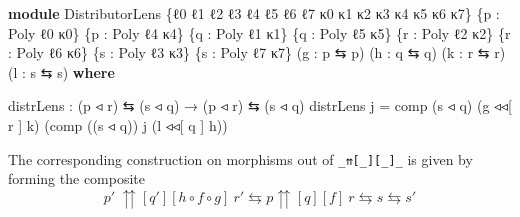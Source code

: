 \documentclass[
  11pt,
  oneside,
  article]{memoir}
\newenvironment{Shaded}{}{}
\newcommand{\KeywordTok}[1]{\textcolor[rgb]{0.00,0.44,0.13}{\textbf{#1}}}
\newcommand{\NormalTok}[1]{#1}
\newcommand{\OtherTok}[1]{\textcolor[rgb]{0.00,0.44,0.13}{#1}}
\theoremstyle{definition}
\theoremstyle{plain}
\newcommand{\0}{\textsf{0}}
\newcommand{\1}{\tn{\textsf{1}}}
\begin{document}
\begin{Shaded}
\begin{Highlighting}[]
\KeywordTok{module}\NormalTok{ DistributorLens }\OtherTok{\{}\NormalTok{ℓ0 ℓ1 ℓ2 ℓ3 ℓ4 ℓ5 ℓ6 ℓ7}
\NormalTok{                        κ0 κ1 κ2 κ3 κ4 κ5 κ6 κ7}\OtherTok{\}}
                       \OtherTok{\{}\NormalTok{p }\OtherTok{:}\NormalTok{ Poly ℓ0 κ0}\OtherTok{\}} \OtherTok{\{}\NormalTok{p\textquotesingle{} }\OtherTok{:}\NormalTok{ Poly ℓ4 κ4}\OtherTok{\}}
                       \OtherTok{\{}\NormalTok{q }\OtherTok{:}\NormalTok{ Poly ℓ1 κ1}\OtherTok{\}} \OtherTok{\{}\NormalTok{q\textquotesingle{} }\OtherTok{:}\NormalTok{ Poly ℓ5 κ5}\OtherTok{\}}
                       \OtherTok{\{}\NormalTok{r }\OtherTok{:}\NormalTok{ Poly ℓ2 κ2}\OtherTok{\}} \OtherTok{\{}\NormalTok{r\textquotesingle{} }\OtherTok{:}\NormalTok{ Poly ℓ6 κ6}\OtherTok{\}}
                       \OtherTok{\{}\NormalTok{s }\OtherTok{:}\NormalTok{ Poly ℓ3 κ3}\OtherTok{\}} \OtherTok{\{}\NormalTok{s\textquotesingle{} }\OtherTok{:}\NormalTok{ Poly ℓ7 κ7}\OtherTok{\}}
                       \OtherTok{(}\NormalTok{g }\OtherTok{:}\NormalTok{ p\textquotesingle{} ⇆ p}\OtherTok{)} \OtherTok{(}\NormalTok{h }\OtherTok{:}\NormalTok{ q ⇆ q\textquotesingle{}}\OtherTok{)} 
                       \OtherTok{(}\NormalTok{k }\OtherTok{:}\NormalTok{ r\textquotesingle{} ⇆ r}\OtherTok{)} \OtherTok{(}\NormalTok{l }\OtherTok{:}\NormalTok{ s ⇆ s\textquotesingle{}}\OtherTok{)} \KeywordTok{where}

\NormalTok{    distrLens }\OtherTok{:} \OtherTok{(}\NormalTok{p ◃ r}\OtherTok{)}\NormalTok{ ⇆ }\OtherTok{(}\NormalTok{s ◃ q}\OtherTok{)} \OtherTok{→} \OtherTok{(}\NormalTok{p\textquotesingle{} ◃ r\textquotesingle{}}\OtherTok{)}\NormalTok{ ⇆ }\OtherTok{(}\NormalTok{s\textquotesingle{} ◃ q\textquotesingle{}}\OtherTok{)}
\NormalTok{    distrLens j }\OtherTok{=} 
\NormalTok{        comp }\OtherTok{(}\NormalTok{s\textquotesingle{} ◃ q\textquotesingle{}}\OtherTok{)} \OtherTok{(}\NormalTok{g ◃◃[ r ] k}\OtherTok{)} 
             \OtherTok{(}\NormalTok{comp }\OtherTok{((}\NormalTok{s\textquotesingle{} ◃ q\textquotesingle{}}\OtherTok{))}\NormalTok{ j }
                   \OtherTok{(}\NormalTok{l ◃◃[ q\textquotesingle{} ] h}\OtherTok{))}
\end{Highlighting}
\end{Shaded}

The corresponding construction on morphisms out of
\texttt{\_⇈{[}\_{]}{[}\_{]}\_} is given by forming the composite \[
p' ~ {\upuparrows}[q'][h \circ f \circ g] ~ r' \leftrightarrows p {\upuparrows}[q][f] ~ r \leftrightarrows s \leftrightarrows s'
\]
\end{document}
